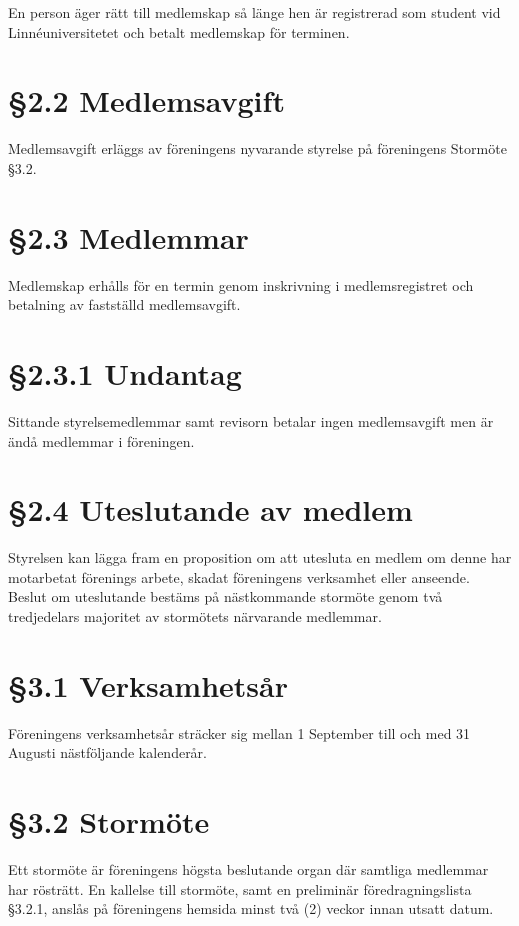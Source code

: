 \documentclass[]{article}
\begin{document}
En person äger rätt till medlemskap så länge hen är registrerad som
student vid Linnéuniversitetet och betalt medlemskap för terminen.

\section{§2.2 Medlemsavgift}\label{medlemsavgift}

Medlemsavgift erläggs av föreningens nyvarande styrelse på föreningens
Stormöte §3.2.

\section{§2.3 Medlemmar}\label{medlemmar}

Medlemskap erhålls för en termin genom inskrivning i medlemsregistret
och betalning av fastställd medlemsavgift.

\section{§2.3.1 Undantag}\label{undantag}

Sittande styrelsemedlemmar samt revisorn betalar ingen medlemsavgift men
är ändå medlemmar i föreningen.

\section{§2.4 Uteslutande av medlem}\label{uteslutande-av-medlem}

Styrelsen kan lägga fram en proposition om att utesluta en medlem om
denne har motarbetat förenings arbete, skadat föreningens verksamhet
eller anseende. Beslut om uteslutande bestäms på nästkommande stormöte
genom två tredjedelars majoritet av stormötets närvarande medlemmar.

\section{§3.1 Verksamhetsår}\label{verksamhetsuxe5r}

Föreningens verksamhetsår sträcker sig mellan 1 September till och med
31 Augusti nästföljande kalenderår.

\section{§3.2 Stormöte}\label{stormuxf6te}

Ett stormöte är föreningens högsta beslutande organ där samtliga
medlemmar har rösträtt. En kallelse till stormöte, samt en preliminär
föredragningslista §3.2.1, anslås på föreningens hemsida minst två (2)
veckor innan utsatt datum.
\end{document}
